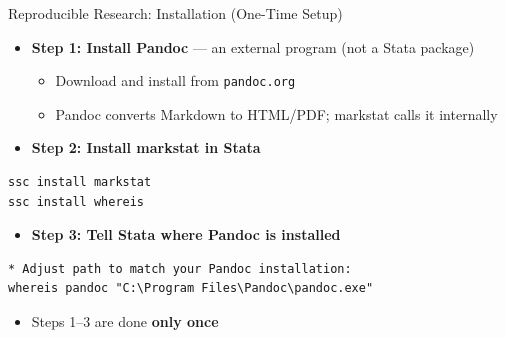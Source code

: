 \documentclass[dvipsnames,hyperref={pdfpagelabels=false}]{beamer}
\begin{document}
\begin{frame}[fragile]{Reproducible Research: Installation (One-Time Setup)}

	\begin{itemize}
		\item \textbf{Step 1: Install Pandoc} --- an external program (not a Stata package)
		\vspace{0.2cm}
		\begin{itemize}
			\item Download and install from \texttt{pandoc.org}
			\vspace{0.1cm}
			\item Pandoc converts Markdown to HTML/PDF; markstat calls it internally
		\end{itemize}
	\end{itemize}

	\vspace{0.3cm}

	\begin{itemize}
		\item \textbf{Step 2: Install markstat in Stata}
	\end{itemize}

\begin{lstlisting}
ssc install markstat
ssc install whereis
\end{lstlisting}

	\begin{itemize}
		\item \textbf{Step 3: Tell Stata where Pandoc is installed}
	\end{itemize}

\begin{lstlisting}
* Adjust path to match your Pandoc installation:
whereis pandoc "C:\Program Files\Pandoc\pandoc.exe"
\end{lstlisting}

	\begin{itemize}
		\item Steps 1--3 are done \textbf{only once}
	\end{itemize}

\end{frame}
\end{document}
